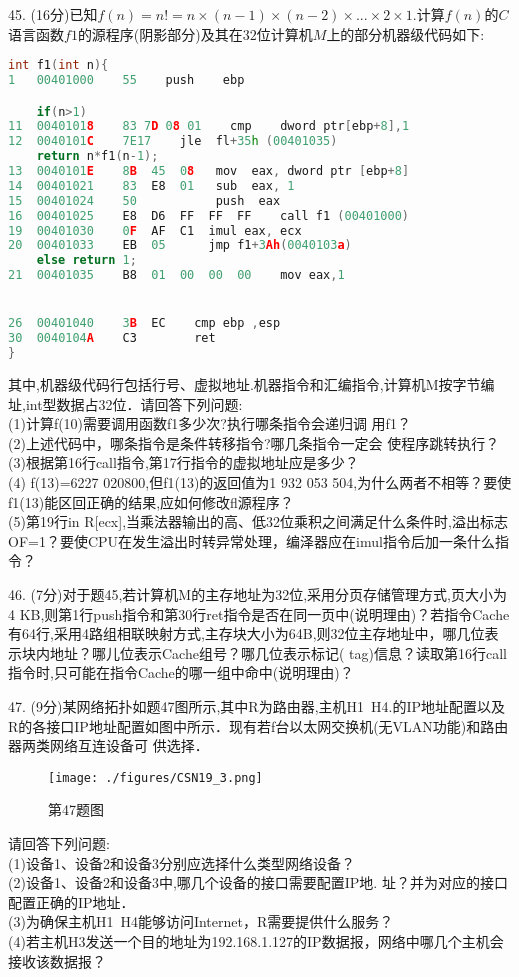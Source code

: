 45. (16分)已知$f(n)=n!=n\times(n-1)\times(n-2)\times...\times2\times1$.计算$f(n)$的$C$语言函数$f1$的源程序(阴影部分)及其在$32$位计算机$M$上的部分机器级代码如下:
\begin{lstlisting}[language=cpp]
int f1(int n){
1   00401000    55    push    ebp

    if(n>1)
11  00401018    83 7D 08 01    cmp    dword ptr[ebp+8],1
12  0040101C    7E17    jle  fl+35h (00401035)
    return n*f1(n-1);
13  0040101E    8B  45  08   mov  eax, dword ptr [ebp+8]
14  00401021    83  E8  01   sub  eax, 1
15  00401024    50           push  eax
16  00401025    E8  D6  FF  FF  FF    call f1 (00401000)
19  00401030    0F  AF  C1  imul eax, ecx
20  00401033    EB  05      jmp f1+3Ah(0040103a)
    else return 1;
21  00401035    B8  01  00  00  00    mov eax,1


26  00401040    3B  EC    cmp ebp ,esp
30  0040104A    C3        ret
}
\end{lstlisting}
其中,机器级代码行包括行号、虚拟地址.机器指令和汇编指令,计算机M按字节编址,int型数据占32位．请回答下列问题: \\
(1)计算f(10)需要调用函数f1多少次?执行哪条指令会递归调
用f1？ \\
(2)上述代码中，哪条指令是条件转移指令?哪几条指令一定会
使程序跳转执行？  \\
(3)根据第16行call指令,第17行指令的虚拟地址应是多少？ \\
(4) f(13)=6227 020800,但f1(13)的返回值为1 932 053 504,为什么两者不相等？要使f1(13)能区回正确的结果,应如何修改fl源程序？ \\
(5)第19行in
R[ecx],当乘法器输出的高、低32位乘积之间满足什么条件时,溢出标志OF=1？要使CPU在发生溢出时转异常处理，编泽器应在imul指令后加一条什么指令？

46. (7分)对于题45,若计算机M的主存地址为32位,采用分页存储管理方式,页大小为4 KB,则第1行push指令和第30行ret指令是否在同一页中(说明理由)？若指令Cache有64行,采用4路组相联映射方式,主存块大小为64B,则32位主存地址中，哪几位表示块内地址？哪儿位表示Cache组号？哪几位表示标记( tag)信息？读取第16行call指令时,只可能在指令Cache的哪一组中命中(说明理由)？

47. (9分)某网络拓扑如题47图所示,其中R为路由器,主机H1~H4.的IP地址配置以及R的各接口IP地址配置如图中所示．现有若f台以太网交换机(无VLAN功能)和路由器两类网络互连设备可
供选择． \\
\begin{figure}[ht]
\centering
\texttt{[image: ./figures/CSN19\_3.png]}
\caption{第47题图} \label{CSN19_fig3}
\end{figure}

请回答下列问题: \\
(1)设备1、设备2和设备3分别应选择什么类型网络设备？  \\
(2)设备1、设备2和设备3中,哪几个设备的接口需要配置IP地.
址？并为对应的接口配置正确的IP地址． \\
(3)为确保主机H1~H4能够访问Internet，R需要提供什么服务？ \\
(4)若主机H3发送一个目的地址为192.168.1.127的IP数据报，网络中哪几个主机会接收该数据报？